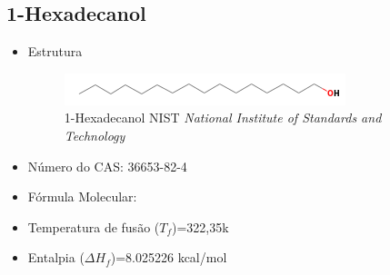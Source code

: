 	\subsection{1-Hexadecanol}
	\label{sec:4}
	\begin{itemize}
		\item Estrutura
		\begin{figure}[H]
			\centering
			\includegraphics[width=0.8\linewidth]{dados/figuras/Hexadecanol.png}
			\caption[1-Hexadecanol]{1-Hexadecanol NIST \textit{National Institute of Standards and Technology}}
			\label{fig:8}
		\end{figure}
		\item Número do CAS: 36653-82-4
		\item Fórmula Molecular:
		\item Temperatura de fusão ($T_f$)=322,35k
		\item Entalpia ($\Delta H_{f}$)=8.025226 kcal/mol
	\end{itemize}
	


	